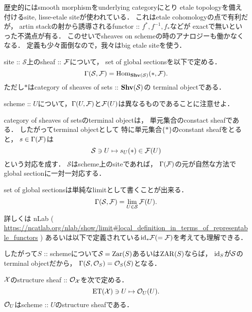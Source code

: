 \begin{Remark}
    歴史的にはsmooth morphismをunderlying categoryにとり
    etale topologyを備え付けるsite, lisse-etale siteが使われている．
    これはetale cohomologyの点で有利だが，
    artin stackの射から誘導されるfunctor :: $f^*, f^{-1}, f_*$などが
    exactで無いといった不満点が有る．
    このせいでsheaves on schemeの時のアナロジーも働かなくなる．
    定義も少々面倒なので，我々はbig etale siteを使う．
\end{Remark}

\begin{Def}
    site :: $\mathcal{S}$上のsheaf :: $\shF$について，
    set of global sectionsを以下で定める．
    \[ \Gamma(\mathcal{S}, \shF)=\Hom_{\Shv(\mathcal{S})}(*, \shF). \]
    ただし$*$はcategory of sheaves of sets :: $\Shv(\mathcal{S})$の
    terminal objectである．
\end{Def}

scheme :: $U$について，$\Gamma(U, \shF)$と$\shF(U)$は異なるものであることに注意せよ．

\begin{Remark}
    category of sheaves of setsのterminal objectは，
    単元集合のconstact sheafである．
    したがってterminal objectとして
    特に単元集合$\{ \ast \}$のconstant sheafをとると，
    $s \in \Gamma(\shF)$は
    \[ \mathcal{S} \ni U \mapsto s_U( \ast ) \in \shF(U) \]
    という対応を成す．
    $\mathcal{S}$はscheme上のsiteであれば，
    $\Gamma(\shF)$の元が自然な方法でglobal sectionに一対一対応する．
\end{Remark}

\begin{Remark}
    set of global sectionsは単純なlimitとして書くことが出来る．
    \[ \Gamma(\siteS, \shF)=\lim_{U \in \siteS} \shF(U). \]
    詳しくは
    nLab ( \url{https://ncatlab.org/nlab/show/limit#local_definition_in_terms_of_representable_functors} )
    あるいは以下で定義されている$\id[*]\shF(=\shF)$を考えても理解できる．

    したがって$S$ :: schemeについて$\siteS=\Zar(S)$あるいは$\ZAR(S)$ならば，
    $\id[S]$が$\siteS$のterminal objectだから，
    $\Gamma(\siteS, \shO_{S})=\shO_{S}(S)$となる．
\end{Remark}

\begin{Def}[\cite{SP} 06TU]
    $\stX$のstructure sheaf :: $\shO_{\stX}$を次で定める．
    \[ \ET(\stX) \ni U \mapsto \shO_{U}(U). \]
    $\shO_U$はscheme :: $U$のstructure sheafである．
\end{Def}


